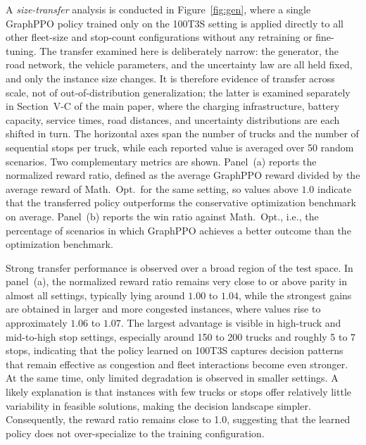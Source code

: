 \documentclass[journal]{IEEEtran}
\begin{document}
A \emph{size-transfer} analysis is conducted in Figure~\ref{fig:gen}, where a single GraphPPO policy trained only on the 100T3S setting is applied directly to all other fleet-size and stop-count configurations without any retraining or fine-tuning. The transfer examined here is deliberately narrow: the generator, the road network, the vehicle parameters, and the uncertainty law are all held fixed, and only the instance size changes. It is therefore evidence of transfer across scale, not of out-of-distribution generalization; the latter is examined separately in Section~V-C of the main paper, where the charging infrastructure, battery capacity, service times, road distances, and uncertainty distributions are each shifted in turn. The horizontal axes span the number of trucks and the number of sequential stops per truck, while each reported value is averaged over 50 random scenarios. Two complementary metrics are shown. Panel~(a) reports the normalized reward ratio, defined as the average GraphPPO reward divided by the average reward of Math.\ Opt.\ for the same setting, so values above $1.0$ indicate that the transferred policy outperforms the conservative optimization benchmark on average. Panel~(b) reports the win ratio against Math.\ Opt., i.e., the percentage of scenarios in which GraphPPO achieves a better outcome than the optimization benchmark.

Strong transfer performance is observed over a broad region of the test space. In panel~(a), the normalized reward ratio remains very close to or above parity in almost all settings, typically lying around $1.00$ to $1.04$, while the strongest gains are obtained in larger and more congested instances, where values rise to approximately $1.06$ to $1.07$. The largest advantage is visible in high-truck and mid-to-high stop settings, especially around 150 to 200 trucks and roughly 5 to 7 stops, indicating that the policy learned on 100T3S captures decision patterns that remain effective as congestion and fleet interactions become even stronger.
At the same time, only limited degradation is observed in smaller settings. A likely explanation is that instances with few trucks or stops offer relatively little variability in feasible solutions, making the decision landscape simpler. Consequently, the reward ratio remains close to 1.0, suggesting that the learned policy does not over-specialize to the training configuration.
\end{document}
